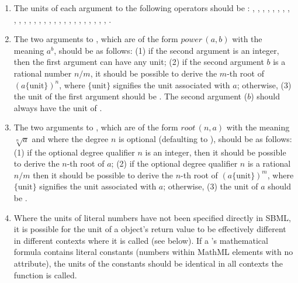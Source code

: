 \begin{enumerate}
\item The units of each argument to the following operators should
  be : , , ,
  , , , ,
  , , , ,
  , , , ,
  , , , ,
  , , , ,
  , , ,
  , .


\item The two arguments to , which are of the form
  $\textit{power}\,(a,b)$ with the meaning $a^b$, should be as
  follows: (1) if the second argument is an integer, then the
  first argument can have any unit; (2) if the second argument $b$
  is a rational number $n/m$, it should be possible to derive the
  $m$-th root of $(a \{\text{unit}\})^n$, where $\{\text{unit}\}$
  signifies the unit associated with $a$; otherwise, (3) the unit
  of the first argument should be .  The second
  argument ($b$) should always have the unit of .

\item The two arguments to , which are of the form
  $\textit{root}\,(n,a)$ with the meaning $\sqrt[n]{a}$ and where
  the degree $n$ is optional (defaulting to ), should be as
  follows: (1) if the optional degree qualifier $n$ is an integer,
  then it should be possible to derive the $n$-th root of $a$; (2)
  if the optional degree qualifier $n$ is a rational $n/m$ then it
  should be possible to derive the $n$-th root of $(a
  \{\text{unit}\})^m$, where $\{\text{unit}\}$ signifies the unit
  associated with $a$; otherwise, (3) the unit of $a$ should be
  .

\item Where the units of literal numbers have not been specified
  directly in SBML, it is possible for the unit of a
  \FunctionDefinition object's return value to be effectively
  different in different contexts where it is called (see below).
  If a \FunctionDefinition's mathematical formula contains literal
  constants (\ie numbers within MathML  elements with no
   attribute), the units of the constants should
  be identical in all contexts the function is called.

\end{enumerate}

